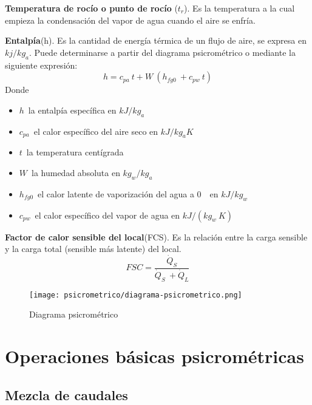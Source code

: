         \textbf{Temperatura de roc\'io o punto de roc\'io} ($t_r$). Es la temperatura a la cual empieza la condensaci\'on del vapor de agua cuando el aire se enfr\'ia.

        \textbf{Entalp\'ia}(h). Es la cantidad de energ\'ia t\'ermica de un flujo de aire, se expresa en $kj/kg_a$. Puede determinarse a partir del diagrama psicrom\'etrico o mediante la siguiente expresi\'on:
        \begin{equation}
            h = c_{pa}\ t + W\ (h_{fg0}\ +c_{pw}\ t)
            \label{eq:entalpia}
        \end{equation}
        Donde
        \begin{itemize}
            \item $h$\ la entalp\'ia espec\'ifica en $kJ/kg_a$
            \item $c_{pa}$\ el calor espec\'ifico del aire seco en $kJ/kg_aK$
            \item $t$\ la temperatura cent\'igrada
            \item $W$\ la humedad absoluta en $kg_w/kg_a$
            \item $h_{fg0}$\ el calor latente de vaporizaci\'on del agua a 0\ \textcelsius\ en $kJ/kg_w$
            \item $c_{pw}$\ el calor espec\'ifico del vapor de agua en $kJ/(kg_w\ K)$
        \end{itemize}
        
        \textbf{Factor de calor sensible del local}(FCS). Es la relaci\'on entre la carga sensible y la carga total (sensible m\'as latente) del local.
        \begin{equation}
            FSC = \frac{\dot{Q}_S}{\dot{Q}_S\ + \dot{Q}_L}
            \label{eq:factor-calor-sensible}
        \end{equation}
        
           \begin{figure}[H]
              \centering
              \texttt{[image: psicrometrico/diagrama-psicrometrico.png]}
              \caption{Diagrama psicrom\'etrico}
              \label{fig:diagrama-psicrometrico}
          \end{figure}

        \section{Operaciones b\'asicas psicrom\'etricas}

        \subsection{Mezcla de caudales}

